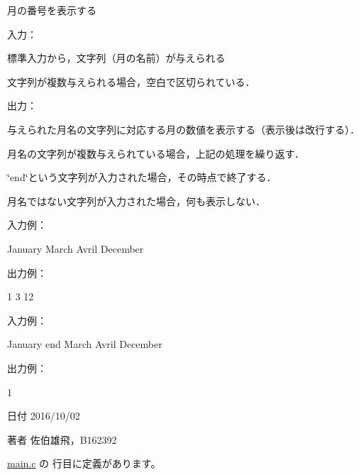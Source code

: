 月の番号を表示する 

入力：
\begin{DoxyItemize}
\item 標準入力から，文字列（月の名前）が与えられる
\item 文字列が複数与えられる場合，空白で区切られている．
\end{DoxyItemize}

出力：
\begin{DoxyItemize}
\item 与えられた月名の文字列に対応する月の数値を表示する（表示後は改行する）．
\item 月名の文字列が複数与えられている場合，上記の処理を繰り返す．
\item \char`\"{}end\char`\"{}という文字列が入力された場合，その時点で終了する．
\item 月名ではない文字列が入力された場合，何も表示しない．
\end{DoxyItemize}

入力例： \begin{DoxyVerb}January March Avril December
\end{DoxyVerb}
 出力例： \begin{DoxyVerb}1
3
12
\end{DoxyVerb}
 入力例： \begin{DoxyVerb}January end March Avril December
\end{DoxyVerb}
 出力例： \begin{DoxyVerb}1
\end{DoxyVerb}
 \begin{DoxyDate}{日付}
2016/10/02 
\end{DoxyDate}
\begin{DoxyAuthor}{著者}
佐伯雄飛，\-B162392 
\end{DoxyAuthor}


 \hyperlink{main_8c_source}{main.\-c} の  行目に定義があります。



